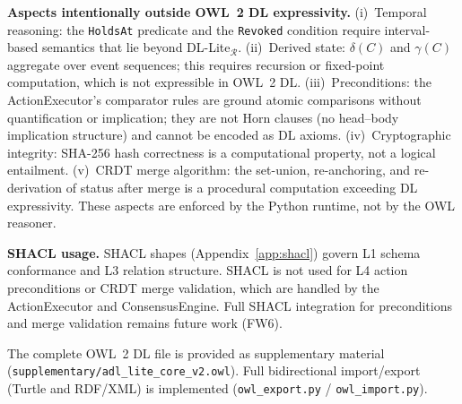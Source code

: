 \textbf{Aspects intentionally outside OWL~2 DL expressivity.} (i)~Temporal reasoning: the \texttt{HoldsAt} predicate and the \texttt{Revoked} condition require interval-based semantics that lie beyond DL-Lite$_{\mathcal{R}}$. (ii)~Derived state: $\delta(C)$ and $\gamma(C)$ aggregate over event sequences; this requires recursion or fixed-point computation, which is not expressible in OWL~2 DL. (iii)~Preconditions: the ActionExecutor's comparator rules are ground atomic comparisons without quantification or implication; they are not Horn clauses (no head--body implication structure) and cannot be encoded as DL axioms. (iv)~Cryptographic integrity: SHA-256 hash correctness is a computational property, not a logical entailment. (v)~CRDT merge algorithm: the set-union, re-anchoring, and re-derivation of status after merge is a procedural computation exceeding DL expressivity. These aspects are enforced by the Python runtime, not by the OWL reasoner.

\textbf{SHACL usage.} SHACL shapes (Appendix~\ref{app:shacl}) govern L1 schema conformance and L3 relation structure. SHACL is not used for L4 action preconditions or CRDT merge validation, which are handled by the ActionExecutor and ConsensusEngine. Full SHACL integration for preconditions and merge validation remains future work (FW6).

The complete OWL~2 DL file is provided as supplementary material (\texttt{supplementary/adl\_lite\_core\_v2.owl}). Full bidirectional import/export (Turtle and RDF/XML) is implemented (\texttt{owl\_export.py} / \texttt{owl\_import.py}).
